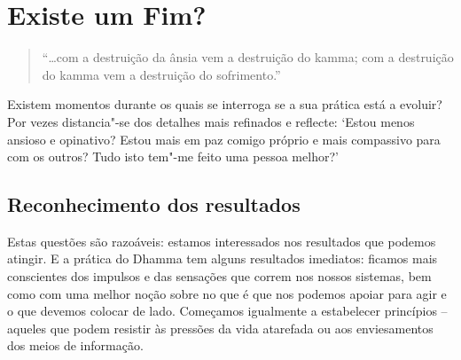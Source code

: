 
\chapter{Existe um Fim?}


\begin{quote}
  ``\ldots{}com a destruição da ânsia vem a destruição do kamma; com a
  destruição do kamma vem a destruição do sofrimento.''

\end{quote}

Existem momentos durante os quais se interroga se a sua prática está a evoluir?
Por vezes distancia"-se dos detalhes mais refinados e reflecte: `Estou menos
ansioso e opinativo? Estou mais em paz comigo próprio e mais compassivo para com
os outros? Tudo isto tem"-me feito uma pessoa melhor?'

\section{Reconhecimento dos resultados}

Estas questões são razoáveis: estamos interessados nos resultados que podemos
atingir. E a prática do Dhamma tem alguns resultados imediatos: ficamos mais
conscientes dos impulsos e das sensações que correm nos nossos sistemas, bem
como com uma melhor noção sobre no que é que nos podemos apoiar para agir e o
que devemos colocar de lado. Começamos igualmente a estabelecer princípios --
aqueles que podem resistir às pressões da vida atarefada ou aos enviesamentos
dos meios de informação.

